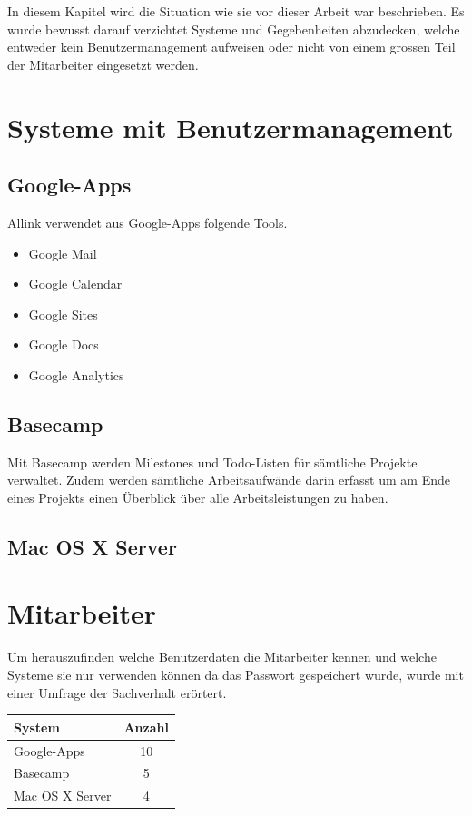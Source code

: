In diesem Kapitel wird die Situation wie sie vor dieser Arbeit war beschrieben. Es wurde bewusst darauf verzichtet Systeme und Gegebenheiten abzudecken, welche entweder kein Benutzermanagement aufweisen oder nicht von einem grossen Teil der Mitarbeiter eingesetzt werden.

\section{Systeme mit Benutzermanagement}
\label{sec:Systeme mit Benutzermanagement}

\subsection{Google-Apps}
\label{subs:Google-Apps}
Allink verwendet aus Google-Apps folgende Tools. 
\begin{itemize}
	\item Google Mail 
	\item Google Calendar 
	\item Google Sites 
	\item Google Docs 
	\item Google Analytics 
\end{itemize}

\subsection{Basecamp}
\label{subs:Basecamp}
Mit Basecamp werden Milestones und Todo-Listen für sämtliche Projekte verwaltet. Zudem werden sämtliche Arbeitsaufwände darin erfasst um am Ende eines Projekts einen Überblick über alle Arbeitsleistungen zu haben.

\subsection{Mac OS X Server}
\label{subs:Mac OS X Server}

\section{Mitarbeiter}
\label{sec:Mitarbeiter}
Um herauszufinden welche Benutzerdaten die Mitarbeiter kennen und welche Systeme sie nur verwenden können da das Passwort gespeichert wurde, wurde mit einer Umfrage der Sachverhalt erörtert.

\begin{tabular}
	{|l | c|} \hline System & Anzahl\\
	\hline Google-Apps & 10\\
	\hline Basecamp & 5\\
	\hline Mac OS X Server & 4\\
	\hline 
\end{tabular}

